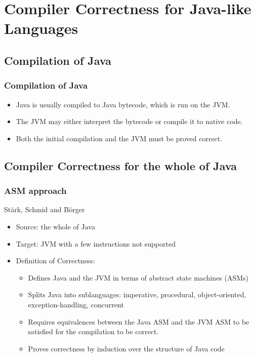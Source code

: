 \documentclass{beamer}
\newcommand{\footmake}[1]{
\ifthenelse{\equal{#1}{}}%
	{}%
	{\footnotetext{#1}}%
}
\newenvironment{slide}[2][fragile,environment=slide]
{\begin{frame}[#1]
	\frametitle{#2}\begin{refsegment}}
{\footmake{\printbibliography[segment=\therefsegment]}\end{refsegment}\end{frame}}
\begin{document}
\section{Compiler Correctness for Java-like Languages}

\frame{\sectionpage}

\subsection{Compilation of Java}

\begin{frame}
  \frametitle{Compilation of Java}
  \begin{itemize}
  \item Java is usually compiled to Java bytecode, which is run on the JVM.
  \item The JVM may either interpret the bytecode or compile it to native code.
  \item Both the initial compilation and the JVM must be proved correct.
  \end{itemize}
  \begin{center}
  \end{center}
\end{frame}

\subsection{Compiler Correctness for the whole of Java}

\begin{slide}{ASM approach}
  St\"{a}rk, Schmid and B\"orger\cite{stark2001}
  \begin{itemize}
  \item Source: the whole of Java
  \item Target: JVM with a few instructions not supported
  \item Definition of Correctness:
    \begin{itemize}
    \item Defines Java and the JVM in terms of abstract state machines (ASMs)
    \item Splits Java into sublanguages: imperative, procedural, object-oriented, exception-handling, concurrent
    \item Requires equivalences between the Java ASM and the JVM ASM to be satisfied for the compilation to be correct.
    \item Proves correctness by induction over the structure of Java code
    \end{itemize}
  \end{itemize}
\end{slide}
\end{document}
